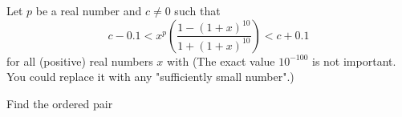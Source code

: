 Let $p$ be a real number and $c\neq 0$ such that \[c-0.1<x^p\left(\dfrac{1-(1+x)^{10}}{1+(1+x)^{10}}\right)<c+0.1\] for all (positive) real numbers $x$ with   (The exact value $10^{-100}$ is not important.  You could replace it with any "sufficiently small number".)

Find the ordered pair 